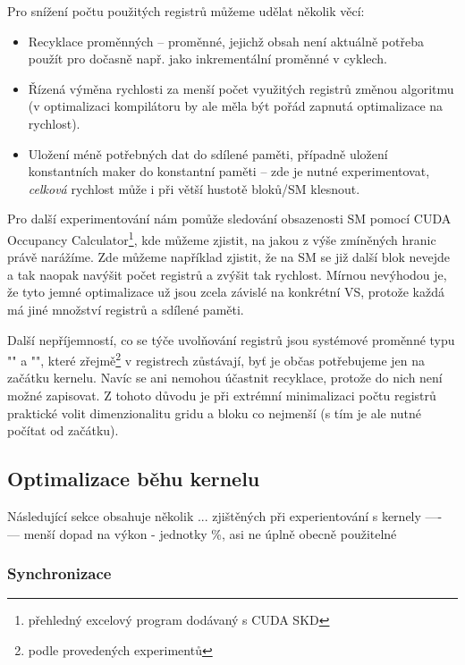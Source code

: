         Pro snížení počtu použitých registrů můžeme udělat několik věcí:
        \begin{itemize}
          \item Recyklace proměnných -- proměnné, jejichž obsah není aktuálně potřeba použít pro dočasně např. jako inkrementální proměnné v cyklech.
          \item Řízená výměna rychlosti za menší počet využitých registrů změnou algoritmu (v optimalizaci kompilátoru by ale měla být pořád zapnutá optimalizace na rychlost).
          \item Uložení méně potřebných dat do sdílené paměti, případně uložení konstantních maker do konstantní paměti -- zde je nutné experimentovat, \emph{celková} rychlost může i při větší hustotě bloků/SM klesnout.
        \end{itemize}
        
        Pro další experimentování nám pomůže sledování obsazenosti SM pomocí CUDA Occupancy Calculator\footnote{přehledný excelový program dodávaný s CUDA SKD}, kde můžeme zjistit, na jakou z výše zmíněných hranic právě narážíme. Zde můžeme například zjistit, že na SM se již další blok nevejde a tak naopak navýšit počet registrů a zvýšit tak rychlost. Mírnou nevýhodou je, že tyto jemné optimalizace už jsou zcela závislé na konkrétní VS, protože každá má jiné množství registrů a sdílené paměti.
        
        Další nepříjemností, co se týče uvolňování registrů jsou systémové proměnné typu \Vr"" a \Vr"", které zřejmě\footnote{podle provedených experimentů} v registrech zůstávají, byť je občas potřebujeme jen na začátku kernelu. Navíc se ani nemohou účastnit recyklace, protože do nich není možné zapisovat. Z tohoto důvodu je při extrémní minimalizaci počtu registrů praktické volit dimenzionalitu gridu a bloku co nejmenší (s tím je ale nutné počítat od začátku).
    
    \subsection{Optimalizace běhu kernelu}
    
    Následující sekce obsahuje několik ... zjištěných při experientování s kernely ---- --- menší dopad na výkon - jednotky \%, asi ne úplně obecně použitelné
    
        \subsubsection{Synchronizace}
        

